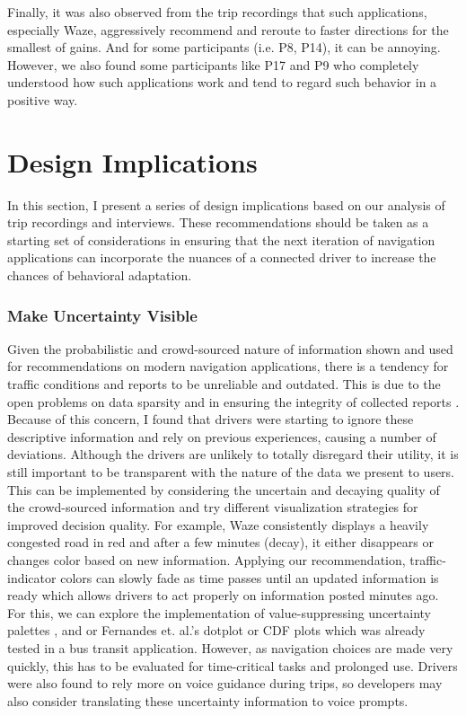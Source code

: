 Finally, it was also observed from the trip recordings that such applications, especially Waze, aggressively recommend and reroute to faster directions for the smallest of gains. And for some participants (i.e. P8, P14), it can be annoying. However, we also found some participants like P17 and P9 who completely understood how such applications work and tend to regard such behavior in a positive way.

\section{Design Implications}
In this section, I present a series of design implications based on our analysis of trip recordings and interviews. These recommendations should be taken as a starting set of considerations in ensuring that the next iteration of navigation applications can incorporate the nuances of a connected driver to increase the chances of behavioral adaptation.

\subsubsection{Make Uncertainty Visible}
Given the probabilistic and crowd-sourced nature of information shown and used for recommendations on modern navigation applications, there is a tendency for traffic conditions and reports to be unreliable and outdated. This is due to the open problems on data sparsity and in ensuring the integrity of collected reports \cite{Attard2016TheSystems,QingYang2015TowardNetworks,Vyroubal2016MobileSystems}. Because of this concern, I found that drivers were starting to ignore these descriptive information and rely on previous experiences, causing a number of deviations. Although the drivers are unlikely to totally disregard their utility, it is still important to be transparent with the nature of the data we present to users. This can be implemented by considering the uncertain and decaying quality of the crowd-sourced information and try different visualization strategies for improved decision quality. For example, Waze consistently displays a heavily congested road in red and after a few minutes (decay), it either disappears or changes color based on new information. Applying our recommendation, traffic-indicator colors can slowly fade as time passes until an updated information is ready which allows drivers to act properly on information posted minutes ago. For this, we can explore the implementation of value-suppressing uncertainty palettes \cite{Correll2018Value-SuppressingPalettes}, and or Fernandes et. al.'s \cite{Fernandes2018UncertaintyDecision-Making} dotplot or CDF plots which was already tested in a bus transit application. However, as navigation choices are made very quickly, this has to be evaluated for time-critical tasks and prolonged use. Drivers were also found to rely more on voice guidance during trips, so developers may also consider translating these uncertainty information to voice prompts.

